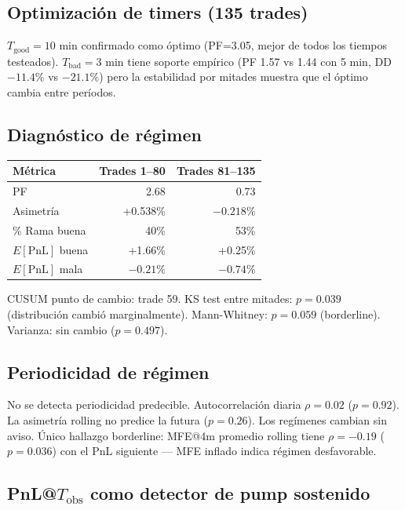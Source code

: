 \documentclass[11pt,a4paper]{article}
\begin{document}
\subsection{Optimización de timers (135 trades)}
 
$T_{\text{good}} = 10$ min confirmado como óptimo (PF=3.05, mejor de todos los tiempos testeados).
$T_{\text{bad}} = 3$ min tiene soporte empírico (PF 1.57 vs 1.44 con 5 min, DD $-11.4\%$ vs $-21.1\%$) pero la estabilidad por mitades muestra que el óptimo cambia entre períodos.
 
\subsection{Diagnóstico de régimen}
 
\begin{table}[H]
\centering
\begin{tabular}{lrr}
\toprule
\textbf{Métrica} & \textbf{Trades 1--80} & \textbf{Trades 81--135} \\
\midrule
PF & 2.68 & 0.73 \\
Asimetría & +0.538\% & $-0.218\%$ \\
\% Rama buena & 40\% & 53\% \\
$E[\text{PnL}]$ buena & +1.66\% & +0.25\% \\
$E[\text{PnL}]$ mala & $-0.21\%$ & $-0.74\%$ \\
\bottomrule
\end{tabular}
\end{table}
 
CUSUM punto de cambio: trade 59. KS test entre mitades: $p = 0.039$ (distribución cambió marginalmente). Mann-Whitney: $p = 0.059$ (borderline). Varianza: sin cambio ($p = 0.497$).
 
\subsection{Periodicidad de régimen}
 
No se detecta periodicidad predecible. Autocorrelación diaria $\rho = 0.02$ ($p = 0.92$). La asimetría rolling no predice la futura ($p = 0.26$). Los regímenes cambian sin aviso. Único hallazgo borderline: MFE@4m promedio rolling tiene $\rho = -0.19$ ($p = 0.036$) con el PnL siguiente --- MFE inflado indica régimen desfavorable.
 
\subsection{PnL@$T_{\text{obs}}$ como detector de pump sostenido}
 
\end{document}
